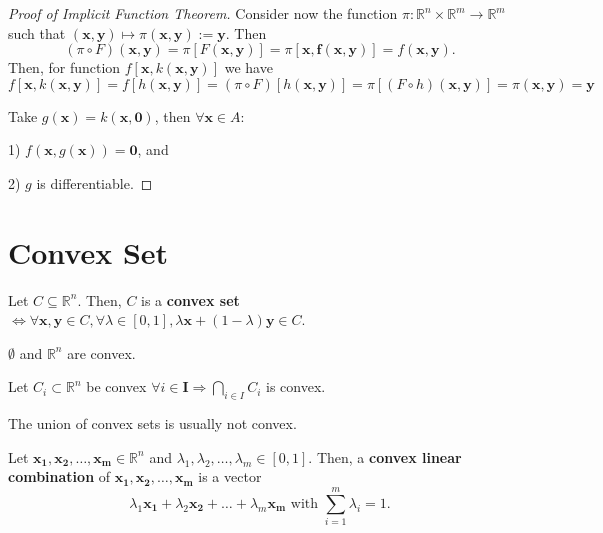 \begin{proof}[Proof of Implicit Function Theorem]
    Consider now the function $\pi : \mathbb{R}^{n} \times \mathbb{R}^{m} \to \mathbb{R}^{m}$ such that $(\mathbf{x,y}) \mapsto \pi (\mathbf{x,y}) := \mathbf{y}$. Then \[
        (\pi \circ F)(\mathbf{x,y}) = \pi [F(\mathbf{x,y})] = \pi [\mathbf{x, f(\mathbf{x,y})}] = f(\mathbf{x,y}).
    \]
    Then, for function $f[\mathbf{x}, k(\mathbf{x,y})] $ we have \[
        f[\mathbf{x}, k(\mathbf{x,y})] = f[h(\mathbf{x,y})] = (\pi \circ F)[h(\mathbf{x,y})] = \pi [(F \circ h)(\mathbf{x,y})] = \pi (\mathbf{x,y}) = \mathbf{y}
    \]

    Take $g(\mathbf{x}) = k(\mathbf{x, 0})$, then $\forall \mathbf{x} \in A$:

    1) $f(\mathbf{x},g(\mathbf{x})) = \mathbf{0}$, and

    2) $g$ is differentiable.
\end{proof}


\section{Convex Set}

\begin{definition}
    Let $C \subseteq \mathbb{R}^{n}$. Then, $C$ is a \textbf{convex set} $\iff \forall \mathbf{x,y} \in C, \forall \lambda \in [0,1], \lambda \mathbf{x} + (1-\lambda)\mathbf{y} \in C$.
\end{definition}

\begin{remark*}
    $\emptyset $ and $\mathbb{R}^{n}$ are convex.
\end{remark*}

\begin{proposition}
    Let $C_i \subset \mathbb{R}^{n}$ be convex $\forall i \in \boldsymbol{I} \Longrightarrow \bigcap_{i \in I}^{}C_i$ is convex.
\end{proposition}

\begin{remark*}
    The union of convex sets is usually not convex.
\end{remark*}


\begin{definition}
    Let $\mathbf{x_1, x_2, \dots, x_m} \in \mathbb{R}^{n}$ and $\lambda_1,\lambda_2,\dots,\lambda_m \in [0,1]$. Then, a \textbf{convex linear combination} of $\mathbf{x_1, x_2, \dots, x_m}$ is a vector \[
        \lambda_1 \mathbf{x_1} + \lambda_2 \mathbf{x_2} + \dots + \lambda_m \mathbf{x_m} \text{ with } \sum_{i=1}^{m} \lambda_i = 1.
    \]
\end{definition}

